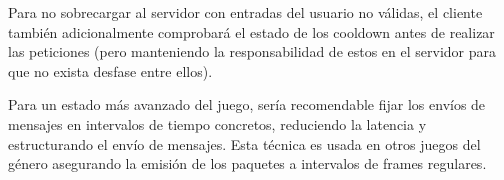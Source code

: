 Para no sobrecargar al servidor con entradas del usuario no válidas, el cliente también adicionalmente comprobará el estado de los cooldown antes de realizar las peticiones (pero manteniendo la responsabilidad de estos en el servidor para que no exista desfase entre ellos).

\vspace{\baselineskip}

Para un estado más avanzado del juego, sería recomendable fijar los envíos de mensajes en intervalos de tiempo concretos, reduciendo la latencia y estructurando el envío de mensajes. Esta técnica es usada en otros juegos del género asegurando la emisión de los paquetes a intervalos de frames regulares.